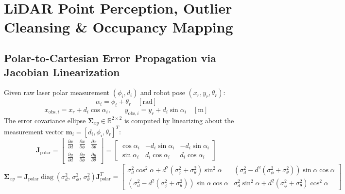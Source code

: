 \documentclass[11pt, a4paper]{article}
\begin{document}
\newpage
\section{LiDAR Point Perception, Outlier Cleansing \& Occupancy Mapping}

\subsection{Polar-to-Cartesian Error Propagation via Jacobian Linearization}
Given raw laser polar measurement $(\phi_i, d_i)$ and robot pose $(x_r, y_r, \theta_r)$:
\begin{equation}
    \alpha_i = \phi_i + \theta_r \quad [\text{rad}]
\end{equation}
\begin{equation}
    x_{\text{obs}, i} = x_r + d_i \cos\alpha_i, \qquad y_{\text{obs}, i} = y_r + d_i \sin\alpha_i \quad [\text{m}]
\end{equation}
The error covariance ellipse $\boldsymbol{\Sigma}_{xy} \in \mathbb{R}^{2 \times 2}$ is computed by linearizing about the measurement vector $\mathbf{m}_i = [d_i, \phi_i, \theta_r]^T$:
\begin{equation}
    \mathbf{J}_{\text{polar}} = \begin{bmatrix} \frac{\partial x}{\partial d} & \frac{\partial x}{\partial \phi} & \frac{\partial x}{\partial \theta} \\ \frac{\partial y}{\partial d} & \frac{\partial y}{\partial \phi} & \frac{\partial y}{\partial \theta} \end{bmatrix} = 
    \begin{bmatrix}
        \cos\alpha_i & -d_i \sin\alpha_i & -d_i \sin\alpha_i \\
        \sin\alpha_i & d_i \cos\alpha_i & d_i \cos\alpha_i
    \end{bmatrix}
\end{equation}
\begin{equation}
    \boldsymbol{\Sigma}_{xy} = \mathbf{J}_{\text{polar}} \operatorname{diag}(\sigma_d^2, \, \sigma_\phi^2, \, \sigma_\theta^2) \mathbf{J}_{\text{polar}}^T = 
    \begin{bmatrix}
        \sigma_d^2 \cos^2\alpha + d^2(\sigma_\phi^2 + \sigma_\theta^2)\sin^2\alpha & (\sigma_d^2 - d^2(\sigma_\phi^2 + \sigma_\theta^2))\sin\alpha\cos\alpha \\
        (\sigma_d^2 - d^2(\sigma_\phi^2 + \sigma_\theta^2))\sin\alpha\cos\alpha & \sigma_d^2 \sin^2\alpha + d^2(\sigma_\phi^2 + \sigma_\theta^2)\cos^2\alpha
    \end{bmatrix}
\end{equation}
\end{document}
